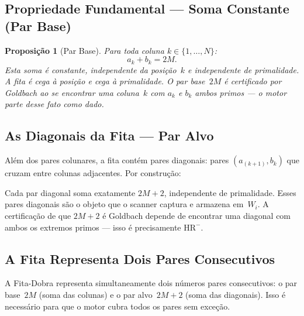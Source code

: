 \documentclass[12pt,a4paper]{article}
\newtheorem{proposition}[theorem]{Proposição}
\theoremstyle{definition}
\newcommand{\HRm}{\mathrm{HR}^{-}}
\begin{document}
\subsection{Propriedade Fundamental — Soma Constante (Par Base)}
\label{subsec:fita-soma}

\begin{proposition}[Par Base]
	Para toda coluna $k \in \{1, \ldots, N\}$:
	\[
		a_k + b_k = 2M.
	\]
	Esta soma é constante, independente da posição~$k$ e independente de
	primalidade. A fita é cega à posição e cega à primalidade. O par
	base~$2M$ é certificado por Goldbach ao se encontrar uma coluna~$k$ com
	$a_k$ e $b_k$ ambos primos — o motor parte desse fato como dado.
\end{proposition}

\subsection{As Diagonais da Fita — Par Alvo}
\label{subsec:fita-diagonais}

Além dos pares colunares, a fita contém pares diagonais: pares
$(a_{(k+1)}, b_k)$ que cruzam entre colunas adjacentes. Por construção:

\begin{center}
\end{center}

\noindent Cada par diagonal soma exatamente $2M{+}2$, independente de
primalidade. Esses pares diagonais são o objeto que o scanner captura e
armazena em~$W_i$. A certificação de que $2M{+}2$ é Goldbach depende de
encontrar uma diagonal com ambos os extremos primos — isso é precisamente
$\HRm$.

\subsection{A Fita Representa Dois Pares Consecutivos}
\label{subsec:fita-dois-pares}

A Fita-Dobra representa simultaneamente dois números pares consecutivos: o
par base~$2M$ (soma das colunas) e o par alvo~$2M{+}2$ (soma das
diagonais). Isso é necessário para que o motor cubra todos os pares sem
exceção.
\end{document}
